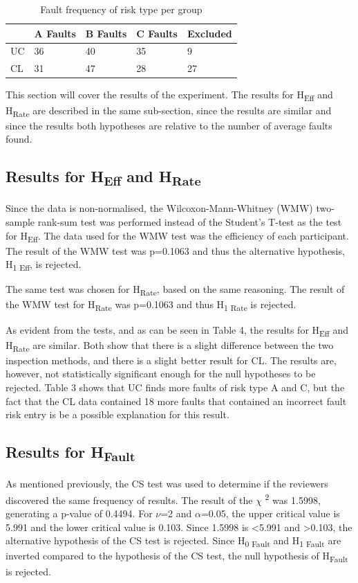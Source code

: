 \documentclass[10pt,twocolumn]{article}
\begin{document}
\begin{table}
	\centering
	\begin{tabular}[ht]{| l | l | l | l | l |}
	\hline
	 & A Faults & B Faults & C Faults & Excluded\\
	\hline
	UC & 36 & 40 & 35 & 9\\
	\hline
	CL & 31 & 47 & 28 & 27\\
	\hline
	\end{tabular}
	\caption{Fault frequency of risk type per group}
\end{table}

This section will cover the results of the experiment. The results for H\textsubscript{Eff} and H\textsubscript{Rate} are described in the same sub-section, since the results are similar and since the results both hypotheses are relative to the number of average faults found. 

\subsection{Results for H\textsubscript{Eff} and H\textsubscript{Rate}}
Since the data is non-normalised, the Wilcoxon-Mann-Whitney (WMW) two-sample rank-sum test was performed instead of the Student's T-test as the test for H\textsubscript{Eff}. The data used for the WMW test was the efficiency of each participant. The result of the WMW test was p=0.1063 and thus the alternative hypothesis, H\textsubscript{1 Eff}, is rejected. 

The same test was chosen for H\textsubscript{Rate}, based on the same reasoning. The result of the WMW test for H\textsubscript{Rate} was p=0.1063 and thus H\textsubscript{1 Rate} is rejected. 

As evident from the tests, and as can be seen in Table 4, the results for H\textsubscript{Eff} and H\textsubscript{Rate} are similar. Both show that there is a slight difference between the two inspection methods, and there is a slight better result for CL. The results are, however, not statistically significant enough for the null hypotheses to be rejected. Table 3 shows that UC finds more faults of risk type A and C, but the fact that the CL data contained 18 more faults that contained an incorrect fault risk entry is be a possible explanation for this result. 


\subsection{Results for H\textsubscript{Fault}}
As mentioned previously, the CS test was used to determine if the reviewers discovered the same frequency of results. The result of the $\chi $ \textsuperscript{2} was 1.5998, generating a p-value of 0.4494. For $\nu$=2 and $\alpha$=0.05, the upper critical value is 5.991 and the lower critical value is 0.103. Since 1.5998 is \textless 5.991 and \textgreater 0.103, the alternative hypothesis of the CS test is rejected. Since H\textsubscript{0 Fault} and H\textsubscript{1 Fault} are inverted compared to the hypothesis of the CS test, the null hypothesis of H\textsubscript{Fault} is rejected.
\end{document}
